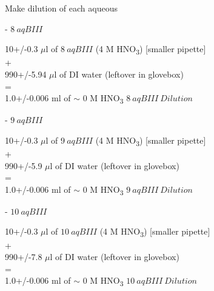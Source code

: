 \documentclass[idxtotoc,hyperref,openany,oneside]{labbook} %
\newcommand{\cmark}{\ding{51}}%
\newcommand{\done}{\rlap{$\square$}{\raisebox{2pt}{\large\hspace{1pt}\cmark}}%
  \hspace{-2.5pt}}
\newcommand{\tsbs}{\textsubscript}
\begin{document}
\begin{todolist}
\item[\done]{Make dilution of each aqueous}
  \begin{todolist}
  \item[\done]{- $\boxed{8\ aqBIII}$}
  \end{todolist}
  \begin{center}
    10+/-0.3 $\mu$l of $\boxed{8\ aqBIII}$
    (4 M HNO\tsbs{3}) [smaller pipette]\\
    +\\
    990+/-5.94 $\mu$l of DI water (leftover in glovebox)\\
    =\\
    1.0+/-0.006 ml of $\sim$
    0 M HNO\tsbs{3} $\boxed{8\ aqBIII\ Dilution}$
  \end{center}
  \begin{todolist}
  \item[\done]{- $\boxed{9\ aqBIII}$}
  \end{todolist}
  \begin{center}
    10+/-0.3 $\mu$l of $\boxed{9\ aqBIII}$
    (4 M HNO\tsbs{3}) [smaller pipette]\\
    +\\
    990+/-5.9 $\mu$l of DI water (leftover in glovebox)\\
    =\\
    1.0+/-0.006 ml of $\sim$
    0 M HNO\tsbs{3} $\boxed{9\ aqBIII\ Dilution}$
  \end{center}
  \begin{todolist}
  \item[\done]{- $\boxed{10\ aqBIII}$}
  \end{todolist}
  \begin{center}
    10+/-0.3 $\mu$l of $\boxed{10\ aqBIII}$
    (4 M HNO\tsbs{3}) [smaller pipette]\\
    +\\
    990+/-7.8 $\mu$l of DI water (leftover in glovebox)\\
    =\\
    1.0+/-0.006 ml of $\sim$
    0 M HNO\tsbs{3} $\boxed{10\ aqBIII\ Dilution}$
  \end{center}


\end{todolist}
\end{document}

